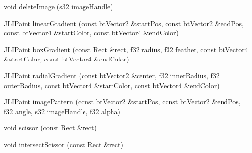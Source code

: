 \begin{DoxyCompactItemize}
\item 
\mbox{\hyperlink{_thread_8h_af1e856da2e658414cb2456cb6f7ebc66}{void}} \mbox{\hyperlink{classnjli_1_1_world_h_u_d_ade08fde0f318b4ffad0ce0345cd34396}{delete\+Image}} (\mbox{\hyperlink{_util_8h_aa62c75d314a0d1f37f79c4b73b2292e2}{s32}} image\+Handle)
\item 
\mbox{\hyperlink{structnjli_1_1_j_l_i_paint}{J\+L\+I\+Paint}} \mbox{\hyperlink{classnjli_1_1_world_h_u_d_a1fca57ce05261de86c129c921b9c5223}{linear\+Gradient}} (const bt\+Vector2 \&start\+Pos, const bt\+Vector2 \&end\+Pos, const bt\+Vector4 \&start\+Color, const bt\+Vector4 \&end\+Color)
\item 
\mbox{\hyperlink{structnjli_1_1_j_l_i_paint}{J\+L\+I\+Paint}} \mbox{\hyperlink{classnjli_1_1_world_h_u_d_a28cd9f803c36c1ed117941319f6de586}{box\+Gradient}} (const \mbox{\hyperlink{classnjli_1_1_rect}{Rect}} \&\mbox{\hyperlink{classnjli_1_1_world_h_u_d_a4183aaaf55fabccdf9d1f9b7614f02a4}{rect}}, \mbox{\hyperlink{_util_8h_a5f6906312a689f27d70e9d086649d3fd}{f32}} radius, \mbox{\hyperlink{_util_8h_a5f6906312a689f27d70e9d086649d3fd}{f32}} feather, const bt\+Vector4 \&start\+Color, const bt\+Vector4 \&end\+Color)
\item 
\mbox{\hyperlink{structnjli_1_1_j_l_i_paint}{J\+L\+I\+Paint}} \mbox{\hyperlink{classnjli_1_1_world_h_u_d_ade8b232c106dea30004091edd418ab20}{radial\+Gradient}} (const bt\+Vector2 \&center, \mbox{\hyperlink{_util_8h_a5f6906312a689f27d70e9d086649d3fd}{f32}} inner\+Radius, \mbox{\hyperlink{_util_8h_a5f6906312a689f27d70e9d086649d3fd}{f32}} outer\+Radius, const bt\+Vector4 \&start\+Color, const bt\+Vector4 \&end\+Color)
\item 
\mbox{\hyperlink{structnjli_1_1_j_l_i_paint}{J\+L\+I\+Paint}} \mbox{\hyperlink{classnjli_1_1_world_h_u_d_a339bb4c0ca3e2a5fff0f7696644abaed}{image\+Pattern}} (const bt\+Vector2 \&start\+Pos, const bt\+Vector2 \&end\+Pos, \mbox{\hyperlink{_util_8h_a5f6906312a689f27d70e9d086649d3fd}{f32}} angle, \mbox{\hyperlink{_util_8h_aa62c75d314a0d1f37f79c4b73b2292e2}{s32}} image\+Handle, \mbox{\hyperlink{_util_8h_a5f6906312a689f27d70e9d086649d3fd}{f32}} alpha)
\item 
\mbox{\hyperlink{_thread_8h_af1e856da2e658414cb2456cb6f7ebc66}{void}} \mbox{\hyperlink{classnjli_1_1_world_h_u_d_a40f16dae5cfeec69081899c6e9e251f2}{scissor}} (const \mbox{\hyperlink{classnjli_1_1_rect}{Rect}} \&\mbox{\hyperlink{classnjli_1_1_world_h_u_d_a4183aaaf55fabccdf9d1f9b7614f02a4}{rect}})
\item 
\mbox{\hyperlink{_thread_8h_af1e856da2e658414cb2456cb6f7ebc66}{void}} \mbox{\hyperlink{classnjli_1_1_world_h_u_d_a36707f986c16c94edb030110e9958d1f}{intersect\+Scissor}} (const \mbox{\hyperlink{classnjli_1_1_rect}{Rect}} \&\mbox{\hyperlink{classnjli_1_1_world_h_u_d_a4183aaaf55fabccdf9d1f9b7614f02a4}{rect}})

\end{DoxyCompactItemize}
